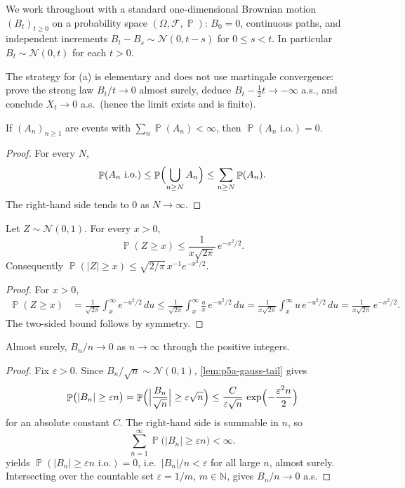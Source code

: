 \documentclass[11pt,a4paper]{article}
\DeclareMathOperator{\Pbb}{\mathbb{P}}
\begin{document}
We work throughout with a standard one-dimensional Brownian motion \((B_t)_{t\ge 0}\) on a probability space \((\Omega,\mathcal{F},\Pbb)\): \(B_0=0\), continuous paths, and independent increments \(B_t-B_s\sim\mathcal{N}(0,t-s)\) for \(0\le s<t\). In particular \(B_t\sim\mathcal{N}(0,t)\) for each \(t>0\).

The strategy for (a) is elementary and does not use martingale convergence: prove the strong law \(B_t/t\to 0\) almost surely, deduce \(B_t-\frac12 t\to-\infty\) a.s., and conclude \(X_t\to 0\) a.s.\ (hence the limit exists and is finite).

\begin{lemma}
\label{lem:p5a-bc1}
If \((A_n)_{n\ge 1}\) are events with \(\sum_n\Pbb(A_n)<\infty\), then \(\Pbb(A_n\text{ i.o.})=0\).
\end{lemma}

\begin{proof}
For every \(N\),
\[
\Pbb(A_n\text{ i.o.})
\le
\Pbb\Bigl(\bigcup_{n\ge N}A_n\Bigr)
\le
\sum_{n\ge N}\Pbb(A_n).
\]
The right-hand side tends to \(0\) as \(N\to\infty\).
\end{proof}

\begin{lemma}
\label{lem:p5a-gauss-tail}
Let \(Z\sim\mathcal{N}(0,1)\). For every \(x>0\),
\[
\Pbb(Z\ge x)
\le
\frac{1}{x\sqrt{2\pi}}\,e^{-x^2/2}.
\]
Consequently \(\Pbb(\lvert Z\rvert\ge x)\le \sqrt{2/\pi}\,x^{-1}e^{-x^2/2}\).
\end{lemma}

\begin{proof}
For \(x>0\),
\begin{align*}
\Pbb(Z\ge x)
&=
\frac{1}{\sqrt{2\pi}}\int_x^\infty e^{-u^2/2}\,du
\le
\frac{1}{\sqrt{2\pi}}\int_x^\infty \frac{u}{x}\,e^{-u^2/2}\,du
=
\frac{1}{x\sqrt{2\pi}}\int_x^\infty u\,e^{-u^2/2}\,du
=
\frac{1}{x\sqrt{2\pi}}\,e^{-x^2/2}.
\end{align*}
The two-sided bound follows by symmetry.
\end{proof}

\begin{lemma}
\label{lem:p5a-integer}
Almost surely, \(B_n/n\to 0\) as \(n\to\infty\) through the positive integers.
\end{lemma}

\begin{proof}
Fix \(\varepsilon>0\). Since \(B_n/\sqrt{n}\sim\mathcal{N}(0,1)\), \cref{lem:p5a-gauss-tail} gives
\[
\Pbb\bigl(\lvert B_n\rvert\ge\varepsilon n\bigr)
=
\Pbb\Bigl(\Bigl\lvert\frac{B_n}{\sqrt{n}}\Bigr\rvert\ge\varepsilon\sqrt{n}\Bigr)
\le
\frac{C}{\varepsilon\sqrt{n}}\,\exp\Bigl(-\frac{\varepsilon^2 n}{2}\Bigr)
\]
for an absolute constant \(C\). The right-hand side is summable in \(n\), so
\[
\sum_{n=1}^\infty\Pbb\bigl(\lvert B_n\rvert\ge\varepsilon n\bigr)<\infty.
\]
 yields \(\Pbb(\lvert B_n\rvert\ge\varepsilon n\text{ i.o.})=0\), i.e.\ \(\lvert B_n\rvert/n<\varepsilon\) for all large \(n\), almost surely. Intersecting over the countable set \(\varepsilon=1/m\), \(m\in\mathbb{N}\), gives \(B_n/n\to 0\) a.s.
\end{proof}
\end{document}
